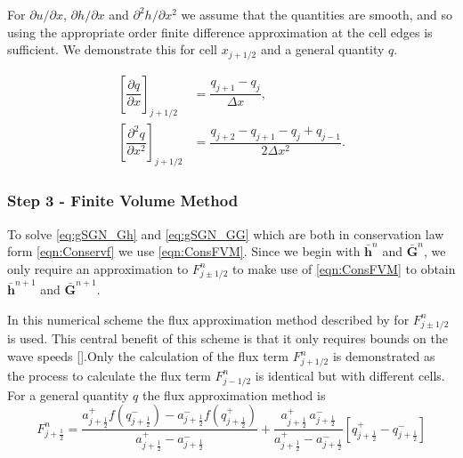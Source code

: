 \documentclass[10pt]{elsarticle}
\newcommand{\vecn}[1]{\boldsymbol{#1}}
\begin{document}
For $\partial u / \partial x$, $\partial h / \partial x$ and $\partial^2 h / \partial x^2$ we assume that the quantities are smooth, and so using the appropriate order finite difference approximation at the cell edges is sufficient. We demonstrate this for cell $x_{j+1/2}$ and a general quantity $q$.

\begin{align*}
\left[\dfrac{\partial q}{\partial x} \right]_{j+1/2} &= \dfrac{q_{j+1} - q_j}{\Delta x}, \\
\left[\dfrac{\partial^2 q}{\partial x^2} \right]_{j+1/2} &=  \dfrac{q_{j+2} - q_{j+1} - q_j + q_{j-1}}{2 \Delta x^2} .
\end{align*}


\subsubsection{Step 3 - Finite Volume Method}
To solve \eqref{eq:gSGN_Gh} and \eqref{eq:gSGN_GG} which are both in conservation law form \eqref{eqn:Conservf} we use \eqref{eqn:ConsFVM}. Since we begin with $\bar{\vecn{h}}^n$ and $\bar{\vecn{G}}^n$, we only require an approximation to $F^n_{j\pm1/2}$ to make use of \eqref{eqn:ConsFVM} to obtain $\bar{\vecn{h}}^{n+1}$ and $\bar{\vecn{G}}^{n+1}$.

In this numerical scheme the flux approximation method described by  \citet{Kurganov-etal-2001-707} for $F^n_{j\pm1/2}$ is used. This central benefit of this scheme is that it only requires bounds on the wave speeds [].Only the calculation of the flux term $F^n_{j+1/2}$ is demonstrated as the process to calculate the flux term $F^n_{j-1/2}$ is identical but with different cells. For a general quantity $q$ the flux approximation method \cite{Kurganov-etal-2001-707} is
\begin{equation}\label{eqn:HLL_flux}
F^n_{j+\frac{1}{2}} = \dfrac{a^+_{j+\frac{1}{2}} f\left(q^-_{j+\frac{1}{2}}\right) - a^-_{j+\frac{1}{2}} f\left(q^+_{j+\frac{1}{2}}\right)}{a^+_{j+\frac{1}{2}} - a^-_{j+\frac{1}{2}}}  + \dfrac{a^+_{j+\frac{1}{2}} \, a^-_{j+\frac{1}{2}}}{a^+_{j+\frac{1}{2}} - a^-_{j+\frac{1}{2}}} \left [ q^+_{j+\frac{1}{2}} - q^-_{j+\frac{1}{2}} \right ]
\end{equation}
\end{document}
